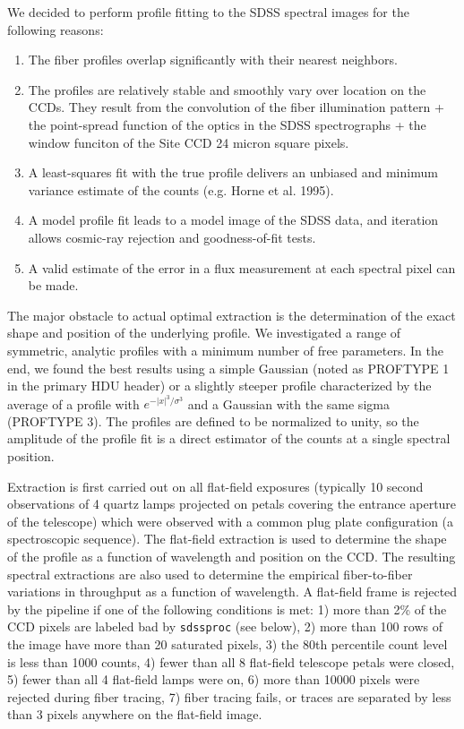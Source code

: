 \documentclass[12pt,preprint]{aastex}
\begin{document}
We decided to perform profile fitting to the 
SDSS spectral images for the following reasons:  

\begin{enumerate}

\item{The fiber profiles overlap significantly with their nearest neighbors.}

\item{The profiles are relatively stable and smoothly vary over 
location on the CCDs.  They result from the convolution of the fiber 
illumination pattern + the point-spread function
of the optics in the SDSS spectrographs + the window funciton of the 
Site CCD 24 micron square pixels. }

\item{A least-squares fit with the true profile delivers an 
unbiased and minimum variance estimate of the counts (e.g. Horne et al. 1995).}

\item{A model profile fit leads to a model image of the SDSS data,
and iteration allows cosmic-ray rejection and goodness-of-fit tests.}

\item{A valid estimate of the error in a flux measurement at 
each spectral pixel can be made.}

\end{enumerate}

The major obstacle to actual optimal extraction is the determination of 
the exact shape and position of the underlying profile.  
We investigated a range of symmetric, analytic profiles with a 
minimum number of free parameters.  In the end, we found the best 
results using a simple Gaussian (noted as PROFTYPE 1 in the primary HDU header) 
or a slightly steeper profile characterized by 
the average of a profile with $e^{-|x|^3/\sigma^3}$ and a Gaussian
with the same sigma (PROFTYPE 3).  The profiles are defined to be 
normalized to unity, so the amplitude of the profile fit is a 
direct estimator of the counts at a single spectral position. 

Extraction is first carried out on all flat-field exposures 
(typically 10 second observations of 4 quartz lamps projected on petals covering the entrance aperture of the telescope) which were observed
with a common plug plate configuration (a spectroscopic sequence). 
The flat-field extraction is used to determine the shape of
the profile as a function of wavelength and position on the CCD.  
The resulting spectral extractions are also used to 
determine the empirical fiber-to-fiber variations in throughput 
as a function of wavelength.   
A flat-field frame is rejected by the pipeline if one of the
following conditions is met:  1) more than 2\% of the CCD pixels are labeled
bad by {\tt sdssproc} (see below), 
2) more than 100 rows of the image have more than 20 saturated pixels, 
3) the 80th percentile count level is less than 1000 counts, 
4) fewer than all 8 flat-field telescope petals were closed, 
5) fewer than all 4 flat-field lamps were on,
6) more than 10000 pixels were rejected during fiber tracing, 
7) fiber tracing fails, or traces are separated by less than 3 pixels anywhere
on the flat-field image.
\end{document}
